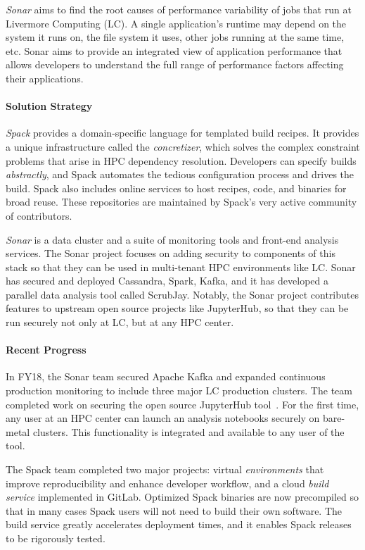 {\it Sonar} aims to find the root causes of performance variability of
jobs that run at Livermore Computing (LC).  A single application's runtime may
depend on the system it runs on, the file system it uses, other jobs
running at the same time, etc. Sonar aims to provide an integrated view
of application performance that allows developers to understand the full
range of performance factors affecting their applications.

\paragraph{Solution Strategy}
{\it Spack} provides a domain-specific language for templated build
recipes.  It provides a unique infrastructure called the {\it
concretizer}, which solves the complex constraint problems that arise in
HPC dependency resolution.  Developers can specify builds {\it
abstractly}, and Spack automates the tedious configuration process and
drives the build. Spack also includes online services to host recipes,
code, and binaries for broad reuse.  These repositories are maintained by
Spack's very active community of contributors.


{\it Sonar} is a data cluster and a suite of monitoring tools and
front-end analysis services. The Sonar project focuses on adding security
to components of this stack so that they can be used in multi-tenant HPC
environments like LC. Sonar has secured and deployed Cassandra, Spark,
Kafka, and it has developed a parallel data analysis tool called
ScrubJay. Notably, the Sonar project contributes features to upstream
open source projects like JupyterHub, so that they can be run securely
not only at LC, but at any HPC center.

\paragraph{Recent Progress}
In FY18, the Sonar team secured Apache Kafka and expanded continuous
production monitoring to include three major LC production clusters. The
team completed work on securing the open source JupyterHub
tool~\cite{mendoza:jupyterhub-ssl}. For the first time, any user at an
HPC center can launch an analysis notebooks securely on bare-metal
clusters. This functionality is integrated and available to any user of
the tool.

The Spack team completed two major projects: virtual {\it environments}
that improve reproducibility and enhance developer workflow, and a cloud
{\it build service} implemented in GitLab. Optimized Spack binaries are
now precompiled so that in many cases Spack users will not need to build
their own software.  The build service greatly accelerates deployment
times, and it enables Spack releases to be rigorously tested.

